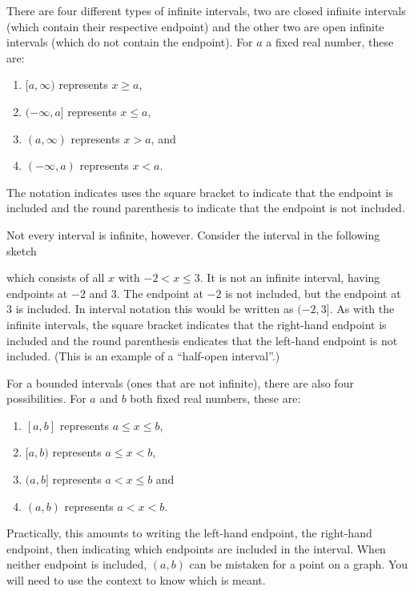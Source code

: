 \documentclass[nooutcomes]{ximera}
\begin{document}
	There are four different types of infinite intervals, two are closed infinite intervals (which contain their respective endpoint) and the other two are open infinite intervals (which do not contain the endpoint). For $a$ a fixed real number, these are:
	\begin{enumerate}
		\item $[a, \infty)$ represents $x \geq a$,
		\item $(-\infty, a]$ represents $x \leq a$,
		\item $(a, \infty)$ represents $x > a$, and
		\item $(-\infty, a)$ represents $x < a$.
	\end{enumerate}
	The notation indicates uses the square bracket to indicate that the endpoint is included and the round parenthesis to indicate that the endpoint is not included. 

	Not every interval is infinite, however. Consider the interval in the following sketch
	\begin{image}
	\end{image}
	which consists of all $x$ with $-2 < x \leq 3$. It is not an infinite interval, having endpoints at $-2$ and $3$. The endpoint at $-2$ is not included, but the endpoint at $3$ is included. In interval notation this would be written as $(-2, 3]$. As with the infinite intervals,
	the square bracket indicates that the right-hand endpoint is included and the round parenthesis endicates that the left-hand endpoint is not included. (This is an example of a ``half-open interval''.)

	For a bounded intervals (ones that are not infinite), there are also four possibilities. For $a$ and $b$ both fixed real numbers, these are:
	\begin{enumerate}
		\item $[a, b]$ represents $a \leq x \leq b$,
		\item $[a, b)$ represents $a \leq x < b$,
		\item $(a, b]$ represents $a < x \leq b$ and
		\item $(a, b)$ represents $a < x < b$.
	\end{enumerate}
	Practically, this amounts to writing the left-hand endpoint, the right-hand endpoint, then indicating which endpoints are included in the interval. When neither endpoint is included, $(a,b)$ can be mistaken for a point on a graph. You will need to use the context
	to know which is meant.
\end{document}
